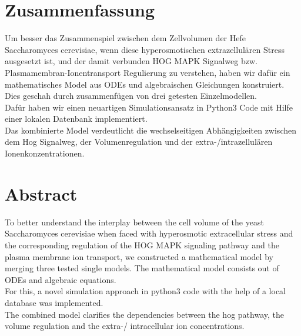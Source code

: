 \section{Zusammenfassung}
Um besser das Zusammenspiel zwischen dem Zellvolumen der Hefe Saccharomyces cerevisiae, wenn diese hyperosmotischen extrazellulären Stress ausgesetzt ist, und der damit verbunden HOG MAPK Signalweg bzw. Plasmamembran-Ionentransport Regulierung zu verstehen, haben wir dafür ein mathematisches Model aus ODEs und algebraischen Gleichungen konstruiert. Dies geschah durch zusammenfügen von drei getesten Einzelmodellen.\\
Dafür haben wir einen neuartigen Simulationsansatz in Python3 Code mit Hilfe einer lokalen Datenbank implementiert.\\
Das kombinierte Model verdeutlicht die wechselseitigen Abhängigkeiten zwischen dem Hog Signalweg, der Volumenregulation und der extra-/intrazellulären Ionenkonzentrationen.

\section{Abstract}
To better understand the interplay between the cell volume of the yeast Saccharomyces cerevisiae when faced with hyperosmotic extracellular stress and the corresponding regulation of the HOG MAPK signaling pathway and the plasma membrane ion transport, we constructed a mathematical model by merging three tested single models. The mathematical model consists out of ODEs and algebraic equations. \\
For this, a novel simulation approach in python3 code with the help of a local database was implemented.\\
The combined model clarifies the dependencies between the hog pathway, the volume regulation and the extra-/ intracellular ion concentrations. 


\newpage